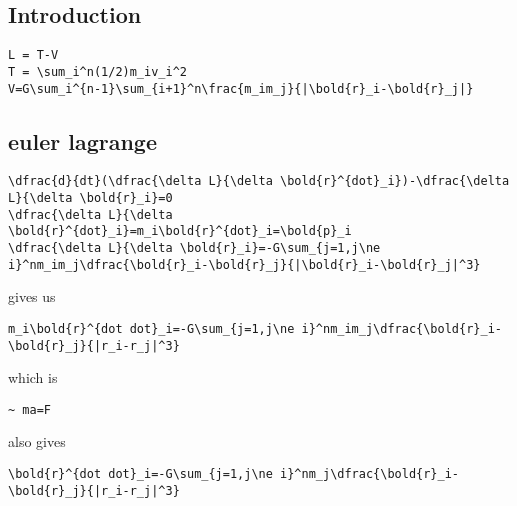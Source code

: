 
\subsection{Introduction}
\begin{verbatim}
L = T-V
T = \sum_i^n(1/2)m_iv_i^2
V=G\sum_i^{n-1}\sum_{i+1}^n\frac{m_im_j}{|\bold{r}_i-\bold{r}_j|}
\end{verbatim}
\subsection{euler lagrange}
\begin{verbatim}
\dfrac{d}{dt}(\dfrac{\delta L}{\delta \bold{r}^{dot}_i})-\dfrac{\delta L}{\delta \bold{r}_i}=0
\dfrac{\delta L}{\delta \bold{r}^{dot}_i}=m_i\bold{r}^{dot}_i=\bold{p}_i
\dfrac{\delta L}{\delta \bold{r}_i}=-G\sum_{j=1,j\ne i}^nm_im_j\dfrac{\bold{r}_i-\bold{r}_j}{|\bold{r}_i-\bold{r}_j|^3}
\end{verbatim}

gives us
\begin{verbatim}
m_i\bold{r}^{dot dot}_i=-G\sum_{j=1,j\ne i}^nm_im_j\dfrac{\bold{r}_i-\bold{r}_j}{|r_i-r_j|^3}
\end{verbatim}
which is
\begin{verbatim}
~ ma=F
\end{verbatim}
also gives
\begin{verbatim}
\bold{r}^{dot dot}_i=-G\sum_{j=1,j\ne i}^nm_j\dfrac{\bold{r}_i-\bold{r}_j}{|r_i-r_j|^3}

\end{verbatim}

